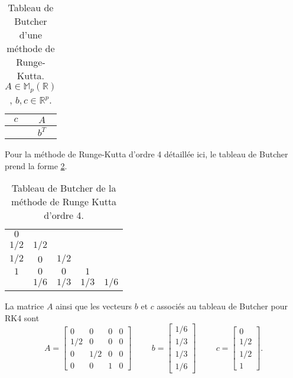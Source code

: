 \begin{table}[htbp]
\begin{center}
\begin{tabular}{c|c}
$c$ & $A$ \\
\hline
    & $b^T$
\end{tabular}
\end{center}
\caption{Tableau de Butcher d'une méthode de Runge-Kutta. $A \in \mathbb{M}_p(\mathbb{R})$, $b,c \in \mathbb{R}^p$.}
\label{tab:butcher}
\end{table}
Pour la méthode de Runge-Kutta d'ordre 4 détaillée ici, le tableau de Butcher prend la forme \ref{tab:butcher_rk4}.
\begin{table}[htbp]
\begin{center}
\begin{tabular}{c|cccc}
$0$   &       &      &      &      \\
$1/2$ & $1/2$ &      &      &      \\
$1/2$ & $0$   & $1/2$&      &      \\
$1$   & $0$   & $0$  & $1$  &      \\  
\hline
      & $1/6$ & $1/3$& $1/3$& $1/6$\\
\end{tabular}
\end{center}
\caption{Tableau de Butcher de la méthode de Runge Kutta d'ordre 4.}
\label{tab:butcher_rk4}
\end{table}
La matrice $A$ ainsi que les vecteurs $b$ et $c$ associés au tableau de Butcher pour RK4 sont
\begin{equation}
A= \begin{bmatrix}
0 & 0 & 0 & 0 \\
1/2& 0& 0 & 0 \\
0 &1/2& 0 & 0 \\
0 & 0 & 1 & 0
\end{bmatrix}
\hspace{1cm}
b=\begin{bmatrix}
1/6\\1/3\\1/3\\1/6
\end{bmatrix}
\hspace{1cm}
c=\begin{bmatrix}
0\\1/2\\1/2\\1
\end{bmatrix}.
\end{equation}

